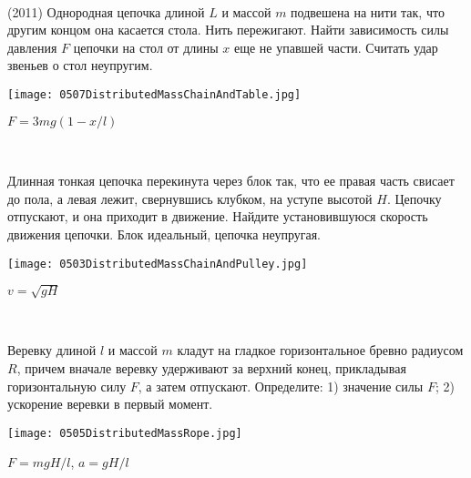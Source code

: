 \begin{ex}
\hspace{0pt} \\
\begin{minipage}{.65\textwidth}
(2011) Однородная цепочка длиной $L$ и массой $m$ подвешена на нити так, что другим концом она касается стола. Нить пережигают. Найти зависимость силы давления $F$ цепочки на стол от длины $x$ еще не упавшей части. Считать удар звеньев о стол неупругим.
\end{minipage}
\begin{minipage}{.35\textwidth}
\centering
\texttt{[image: 0507DistributedMassChainAndTable.jpg]}
\end{minipage}
\begin{ans}
$F = 3mg(1-x/l)$
\end{ans}
\end{ex}

\begin{ex}
\hspace{0pt} \\
\begin{minipage}{.65\textwidth}
Длинная тонкая цепочка перекинута через блок так, что ее правая часть свисает до пола, а левая лежит, свернувшись клубком, на уступе высотой $H$. Цепочку отпускают, и она приходит в движение. Найдите установившуюся скорость движения цепочки. Блок идеальный, цепочка неупругая.
\end{minipage}
\begin{minipage}{.35\textwidth}
\centering
\texttt{[image: 0503DistributedMassChainAndPulley.jpg]}
\end{minipage}
\begin{ans}
$v = \sqrt{gH}$
\end{ans}
\end{ex}

\begin{ex}
\hspace{0pt} \\
\begin{minipage}{.65\textwidth}
Веревку длиной $l$ и массой $m$ кладут на гладкое горизонтальное бревно радиусом $R$, причем вначале веревку удерживают за верхний конец, прикладывая горизонтальную силу $F$, а затем отпускают. Определите: 1) значение силы $F$; 2) ускорение веревки в первый момент.
\end{minipage}
\begin{minipage}{.35\textwidth}
\centering
\texttt{[image: 0505DistributedMassRope.jpg]}
\end{minipage}
\begin{ans}
$F = mgH/l$, $a = gH/l$
\end{ans}
\end{ex}

